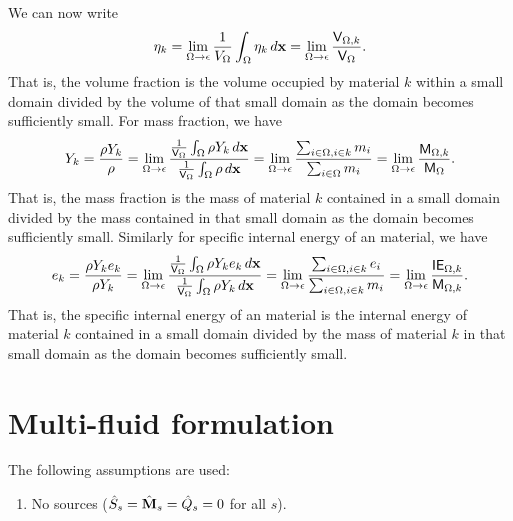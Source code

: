 \documentclass[a4paper,11pt]{report}
\begin{document}
We can now write 
\begin{equation}
    \label{eq:atomistic_mix_eta}
    \eta_k = \lim_{\Omega \to \epsilon} \frac{1}{V_\Omega} \int_\Omega \eta_k \, d\mathbf{x} = \lim_{\Omega \to \epsilon} \frac{ \mathsf{V}_{\Omega,k} }{ \mathsf{V}_\Omega }.
\end{equation}
That is, the volume fraction is the volume occupied by material $k$ within a small domain divided by the volume of that small domain as the domain becomes sufficiently small.
For mass fraction, we have
\begin{equation}
    \label{eq:atomistic_mix_Y}
    Y_k = \frac{\rho Y_k}{\rho} = \lim_{\Omega \to \epsilon} \frac{ \frac{1}{\mathsf{V}_\Omega} \int_\Omega \rho Y_k \, d\mathbf{x} }{ \frac{1}{\mathsf{V}_\Omega} \int_\Omega \rho \, d\mathbf{x} } = \lim_{\Omega \to \epsilon} \frac{ \sum_{i \in \Omega, i \in k} m_i }{ \sum_{i \in \Omega} m_i } = \lim_{\Omega \to \epsilon} \frac{ \mathsf{M}_{\Omega,k} }{ \mathsf{M}_\Omega }.
\end{equation}
That is, the mass fraction is the mass of material $k$ contained in a small domain divided by the mass contained in that small domain as the domain becomes sufficiently small. Similarly for specific internal energy of an material, we have
\begin{equation}
    \label{eq:atomistic_mix_e}
    e_k = \frac{\rho Y_k e_k}{\rho Y_k } = \lim_{\Omega \to \epsilon} \frac{ \frac{1}{\mathsf{V}_\Omega} \int_\Omega \rho Y_k e_k \, d\mathbf{x} }{ \frac{1}{\mathsf{V}_\Omega} \int_\Omega \rho Y_k \, d\mathbf{x} } = \lim_{\Omega \to \epsilon} \frac{ \sum_{i \in \Omega, i \in k} e_i }{ \sum_{i \in \Omega, i \in k} m_i } = \lim_{\Omega \to \epsilon} \frac{ \mathsf{IE}_{\Omega,k} }{ \mathsf{M}_{\Omega,k} }.
\end{equation}
That is, the specific internal energy of an material is the internal energy of material $k$ contained in a small domain divided by the mass of material $k$ in that small domain as the domain becomes sufficiently small.

\section{Multi-fluid formulation}
The following assumptions are used:
\begin{enumerate}
    \item No sources ($\hat{S}_s = \hat{\mathbf{M}}_s = \hat{Q}_s = 0$ for all $s$).
\end{enumerate}
\end{document}
